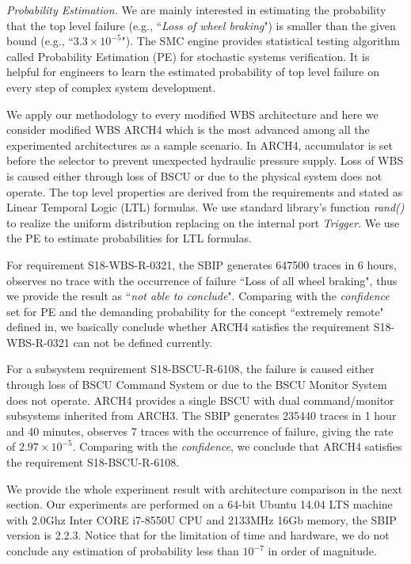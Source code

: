 \emph{Probability Estimation.}
We are mainly interested in estimating the probability that the top level failure (e.g., ``\emph{Loss of wheel braking}") is smaller than the given bound (e.g., ``$3.3\times10^{-5}$"). The SMC engine provides statistical testing algorithm called Probability Estimation (PE)\cite{vmcai04} for stochastic systems verification. It is helpful for engineers to learn the estimated probability of top level failure on every step of complex system development.

We apply our methodology to every modified WBS architecture and here we consider modified WBS ARCH4 which is the most advanced among all the experimented architectures as a sample scenario.
In ARCH4, accumulator is set before the selector to prevent unexpected hydraulic pressure supply. Loss of WBS is caused either through loss of BSCU or due to the physical system does not operate. The top level properties are derived from the requirements and stated as Linear Temporal Logic (LTL) formulas. We use standard library's function \emph{rand()} to realize the uniform distribution\cite{uniform} replacing on the internal port \emph{Trigger}. We use the PE to estimate probabilities for LTL formulas. 

For requirement S18-WBS-R-0321, the SBIP generates 647500 traces in 6 hours, observes no trace with the occurrence of failure ``Loss of all wheel braking", thus we provide the result as ``\emph{not able to conclude}". Comparing with the \emph{confidence} set for PE and the demanding probability for the concept ``extremely remote" defined in\cite{ac}, we basically conclude whether ARCH4 satisfies the requirement S18-WBS-R-0321 can not be defined currently.

For a subsystem requirement S18-BSCU-R-6108, the failure is caused either through loss of BSCU Command System or due to the BSCU Monitor System does not operate. ARCH4 provides a single BSCU with dual command/monitor subsystems inherited from ARCH3. The SBIP generates 235440 traces in 1 hour and 40 minutes, observes 7 traces with the occurrence of failure, giving the rate of $2.97\times10^{-5}$. Comparing with the \emph{confidence}, we conclude that ARCH4 satisfies the requirement S18-BSCU-R-6108.

We provide the whole experiment result with architecture comparison in the next section. Our experiments are performed on a 64-bit Ubuntu 14.04 LTS machine with 2.0Ghz Inter CORE i7-8550U CPU and 2133MHz 16Gb memory, the SBIP version is 2.2.3. Notice that for the limitation of time and hardware, we do not conclude any estimation of probability less than $10^{-7}$ in order of magnitude.

